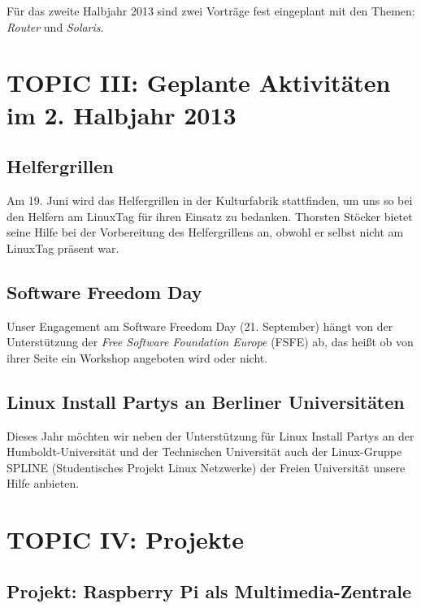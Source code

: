 \documentclass[11pt,a4paper,ngerman]{article}
\begin{document}
Für das zweite Halbjahr 2013 sind zwei Vorträge fest eingeplant mit den Themen: 
\textsl{Router} und \textsl{Solaris}.


\section{TOPIC III: Geplante Aktivitäten im 2. Halbjahr 2013}


  \subsection{Helfergrillen}
  
Am 19. Juni wird das Helfergrillen in der Kulturfabrik stattfinden, um uns so 
bei den Helfern am LinuxTag für ihren Einsatz zu bedanken. Thorsten Stöcker 
bietet seine Hilfe bei der Vorbereitung des Helfergrillens an, obwohl er 
selbst nicht am LinuxTag präsent war.



  \subsection{Software Freedom Day}
  
Unser Engagement am Software Freedom Day (21. September) hängt von der 
Unterstützung der \emph{Free Software Foundation Europe} (FSFE) ab, das heißt 
ob von ihrer Seite ein Workshop angeboten wird oder nicht.


  \subsection{Linux Install Partys an Berliner Universitäten}

Dieses Jahr möchten wir neben der Unterstützung für Linux Install Partys an der 
Humboldt-Universität und der Technischen Universität auch der Linux-Gruppe 
SPLINE (Studentisches Projekt Linux Netzwerke) der Freien Universität unsere 
Hilfe anbieten.


\section{TOPIC IV: Projekte}


  \subsection{Projekt: Raspberry Pi als Multimedia-Zentrale}
  
\end{document}
